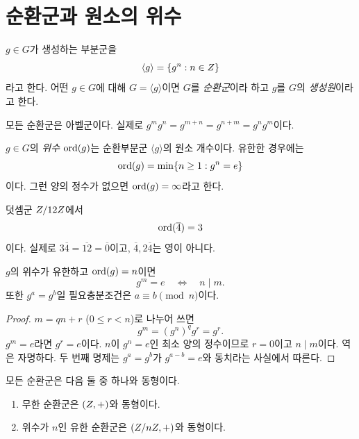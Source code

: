 \section{순환군과 원소의 위수}
\label{sec:cyclic-groups}

\begin{definition}
$g\in G$가 생성하는 부분군을
\[
  \langle g\rangle=\{g^n:n\in Z\}
\]
라고 한다. 어떤 $g\in G$에 대해 $G=\langle g\rangle$이면 $G$를 \emph{순환군}이라 하고 $g$를 $G$의 \emph{생성원}이라고 한다.
\end{definition}

모든 순환군은 아벨군이다. 실제로 $g^m g^n=g^{m+n}=g^{n+m}=g^ng^m$이다.

\begin{definition}[원소의 위수]
$g\in G$의 \emph{위수} $\operatorname{ord}(g)$는 순환부분군 $\langle g\rangle$의 원소 개수이다. 유한한 경우에는
\[
  \operatorname{ord}(g)=\min\{n\ge1:g^n=e\}
\]
이다. 그런 양의 정수가 없으면 $\operatorname{ord}(g)=\infty$라고 한다.
\end{definition}

\begin{example}
덧셈군 $Z/12Z$에서
\[
  \operatorname{ord}(\overline4)=3
\]
이다. 실제로 $3\overline4=\overline{12}=\overline0$이고, $\overline4,2\overline4$는 영이 아니다.
\end{example}

\begin{proposition}
$g$의 위수가 유한하고 $\operatorname{ord}(g)=n$이면
\[
  g^m=e\quad\Longleftrightarrow\quad n\mid m.
\]
또한 $g^a=g^b$일 필요충분조건은 $a\equiv b\pmod n$이다.
\end{proposition}

\begin{proof}
$m=qn+r$ ($0\le r<n$)로 나누어 쓰면
\[
  g^m=(g^n)^qg^r=g^r.
\]
$g^m=e$라면 $g^r=e$이다. $n$이 $g^n=e$인 최소 양의 정수이므로 $r=0$이고 $n\mid m$이다. 역은 자명하다. 두 번째 명제는 $g^a=g^b$가 $g^{a-b}=e$와 동치라는 사실에서 따른다.
\end{proof}

\begin{theorem}[순환군의 분류]
모든 순환군은 다음 둘 중 하나와 동형이다.
\begin{enumerate}[label=(\arabic*)]
  \item 무한 순환군은 $(Z,+)$와 동형이다.
  \item 위수가 $n$인 유한 순환군은 $(Z/nZ,+)$와 동형이다.
\end{enumerate}
\end{theorem}


